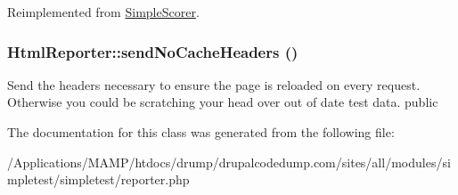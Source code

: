Reimplemented from \hyperlink{class_simple_scorer_aa82186cb9bf706d675336aefd6ba355f}{SimpleScorer}.\hypertarget{class_html_reporter_a766ff4a9d0fea6de3734a6c9977fb63d}{
\subsubsection[{sendNoCacheHeaders}]{\setlength{\rightskip}{0pt plus 5cm}HtmlReporter::sendNoCacheHeaders ()}}
\label{class_html_reporter_a766ff4a9d0fea6de3734a6c9977fb63d}
Send the headers necessary to ensure the page is reloaded on every request. Otherwise you could be scratching your head over out of date test data.  public 

The documentation for this class was generated from the following file:\begin{DoxyCompactItemize}
\item 
/Applications/MAMP/htdocs/drump/drupalcodedump.com/sites/all/modules/simpletest/simpletest/reporter.php\end{DoxyCompactItemize}
